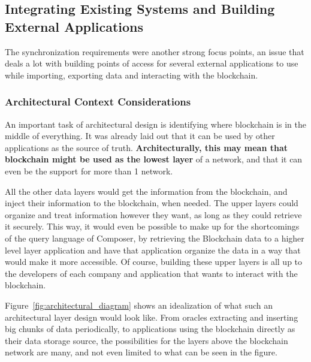 \subsection{Integrating Existing Systems and Building External Applications}

The synchronization requirements were another strong focus points, an issue that deals a lot with building points of access for several external applications to use while importing, exporting data and interacting with the blockchain.

\subsubsection*{Architectural Context Considerations}

An important task of architectural design is identifying where blockchain is in the middle of everything. It was already laid out that it can be used by other applications as the source of truth. \textbf{Architecturally, this may mean that blockchain might be used as the lowest layer} of a network, and that it can even be the support for more than 1 network. 

All the other data layers would get the information from the blockchain, and inject their information to the blockchain, when needed. The upper layers could organize and treat information however they want, as long as they could retrieve it securely. This way, it would even be possible to make up for the shortcomings of the query language of Composer, by retrieving the Blockchain data to a higher level layer application and have that application organize the data in a way that would make it more accessible. Of course, building these upper layers is all up to the developers of each company and application that wants to interact with the blockchain. 

Figure~\ref{fig:architectural_diagram} shows an idealization of what such an architectural layer design would look like. From oracles extracting and inserting big chunks of data periodically, to applications using the blockchain directly as their data storage source, the possibilities for the layers above the blockchain network are many, and not even limited to what can be seen in the figure.

